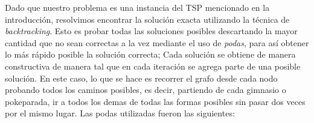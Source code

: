        Dado que nuestro problema es una instancia del TSP mencionado en la introducción, resolvimos encontrar la solución exacta utilizando la técnica de \textit{backtracking}. Esto es probar todas las soluciones posibles descartando la mayor cantidad que no sean correctas a la vez mediante el uso de \textit{podas}, para así obtener lo más rápido posible la solución correcta; Cada solución se obtiene de manera constructiva de manera tal que en cada iteración se agrega parte de una posible solución. En este caso, lo que se hace es recorrer el grafo desde cada nodo probando todos los caminos posibles, es decir, partiendo de cada gimnasio o pokeparada, ir a todos los demas de todas las formas posibles sin pasar dos veces por el mismo lugar. Las podas utilizadas fueron las siguientes:
